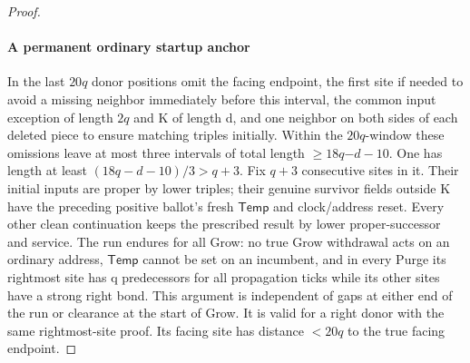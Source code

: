 \begin{proof}
\paragraph{A permanent ordinary startup anchor}

In the last \(20q\) donor positions omit the facing endpoint, the first site if needed to avoid a missing neighbor immediately before this interval, the common input exception of length \(2q\) and K of length d, and one neighbor on both sides of each deleted piece to ensure matching triples initially. Within the \(20q\)-window these omissions leave at most three intervals of total length \(\ge\)\(18q\)\(-\)\(d- 10\). One has length at least \((18q- d- 10)/3>q+3\). Fix \(q+3\) consecutive sites in it. Their initial inputs are proper by lower triples; their genuine survivor fields outside K have the preceding positive ballot's fresh \(\mathsf{Temp}\) and clock/address reset. Every other clean continuation keeps the prescribed result by lower proper-successor and service. The run endures for all Grow: no true Grow withdrawal acts on an ordinary address, \(\mathsf{Temp}\) cannot be set on an incumbent, and in every Purge its rightmost site has q predecessors for all propagation ticks while its other sites have a strong right bond. This argument is independent of gaps at either end of the run or clearance at the start of Grow. It is valid for a right donor with the same rightmost-site proof. Its facing site has distance \(<20q\) to the true facing endpoint.


\end{proof}
